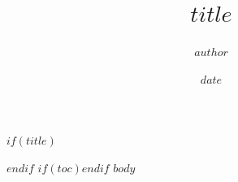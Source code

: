 \documentclass[12pt,a4paper]{report}
\title{$title$}
\author{$author$}
\date{$date$}
\begin{document}
$if(title)$\maketitle$endif$
$if(toc)$\tableofcontents\clearpage$endif$
$body$
\end{document}
